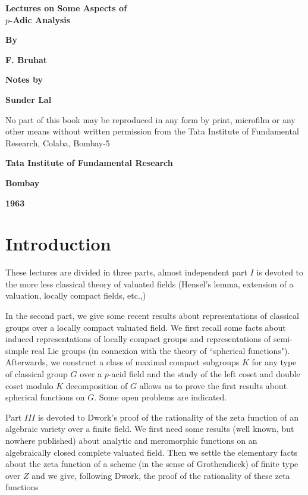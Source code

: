 \thispagestyle{empty}

\begin{center}
{\Large\bf Lectures on Some Aspects of}\\[5pt] 
{\Large\bf {\boldmath $p$-}Adic Analysis}\\[5pt]
\vskip 1cm

{\bf  By}
\medskip

{\large\bf  F. Bruhat}
\vfill


{\bf  Notes by}
\medskip

{\large\bf  Sunder Lal}
\vfill


\parbox{0.7\textwidth}{
No part of this book may be reproduced in any form by print,
microfilm or any other means without written permission from the
Tata Institute of Fundamental Research, Colaba, Bombay-5}
\vfill

{\bf  Tata Institute of Fundamental Research}

{\bf  Bombay}

{\bf  1963}
\end{center}

\eject

\thispagestyle{empty}

\chapter{Introduction}


These lectures are divided in three parts, almost independent part $I$
is devoted to the more less classical theory of valuated  fields
(Hensel's lemma, extension of a valuation, locally compact fields,
etc.,) 

In the second part, we give some recent results about representations
of classical groups over a locally compact valuated field. We first
recall some facts about induced representations of locally compact
groups and representations of semi-simple real Lie groups (in
connexion with the theory of ``spherical functions"). Afterwards, we
construct a class of maximal compact subgroups $K$ for any type of
classical group $G$ over a $p$-acid field and the study of the left
coset and double coset modulo $K$ decomposition of $G$ allows us to
prove the first results about spherical functions on $G$. Some open
problems are indicated.  

Part $III$ is devoted to Dwork's proof of the rationality of the zeta
function of an algebraic variety over a finite field. We first need
some results (well known, but nowhere published) about analytic and
meromorphic functions on an algebraically closed complete valuated
field. Then we settle the elementary facts about the zeta function of
a scheme (in the sense of Grothendieck) of finite type over $Z$ and we
give,  following Dwork, the proof of the rationality of these zeta
functions 
